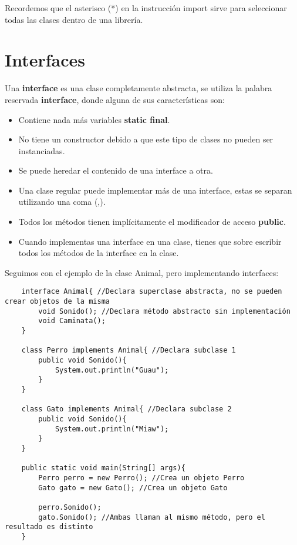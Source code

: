 Recordemos que el asterisco (*) en la instrucción import sirve para seleccionar todas las clases dentro de una librería.



\section{Interfaces}
\hspace{0.55cm}Una \textbf{interface} es una clase completamente abstracta, se utiliza la palabra reservada \textbf{interface}, donde alguna de sus características son:
\begin{itemize}
    \item Contiene nada más variables \textbf{static final}.
    \item No tiene un constructor debido a que este tipo de clases no pueden ser instanciadas.
    \item Se puede heredar el contenido de una interface a otra.
    \item Una clase regular puede implementar más de una interface, estas se separan utilizando una coma (,).
    \item Todos los métodos tienen implícitamente el modificador de acceso \textbf{public}.
    \item Cuando implementas una interface en una clase, tienes que sobre escribir todos los métodos de la interface en la clase.
\end{itemize}

Seguimos con el ejemplo de la clase Animal, pero implementando interfaces:
\begin{lstlisting}
    interface Animal{ //Declara superclase abstracta, no se pueden crear objetos de la misma
        void Sonido(); //Declara método abstracto sin implementación
        void Caminata();
    }
    
    class Perro implements Animal{ //Declara subclase 1
        public void Sonido(){
            System.out.println("Guau");
        }
    }
    
    class Gato implements Animal{ //Declara subclase 2
        public void Sonido(){
            System.out.println("Miaw");
        }
    }
    
    public static void main(String[] args){
        Perro perro = new Perro(); //Crea un objeto Perro
        Gato gato = new Gato(); //Crea un objeto Gato
        
        perro.Sonido();
        gato.Sonido(); //Ambas llaman al mismo método, pero el resultado es distinto
    }
\end{lstlisting}



